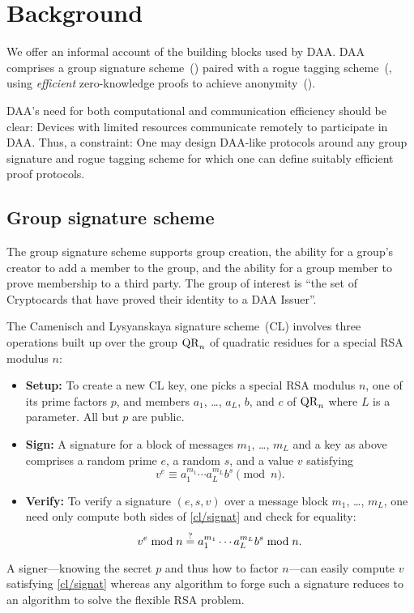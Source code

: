 \section{Background}

\begin{comment}
	\emph{PDS:}
	DAA as a combination of building blocks.
	Why DAA is cool.
	Hilight all the stuff you need to understand in order to understand DAA with words and no math formulae.
\end{comment}

We offer an informal account of the building blocks used by DAA.
DAA comprises a group signature scheme~() paired with a rogue tagging scheme~(, using \emph{efficient} zero-knowledge proofs to achieve anonymity~().

DAA's need for both computational and communication efficiency should be clear:
Devices with limited resources communicate remotely to participate in DAA.
Thus, a constraint: One may design DAA-like protocols around any group
signature and rogue tagging scheme for which one can define suitably efficient
proof protocols.

\subsection{Group signature scheme}

The group signature scheme supports group creation,
the ability for a group's creator to add a member to the group,
and the ability for a group member to prove membership to a third party.
The group of interest is ``the set of Cryptocards that have proved
their identity to a DAA Issuer''.

The Camenisch and Lysyanskaya signature scheme~(CL)
involves three operations built up over the group $\mathrm{QR}_n$
of quadratic residues for a special RSA modulus $n$:
\begin{itemize}

\item \textbf{Setup:} To create a new CL key,
one picks a special RSA modulus $n$, one of its prime
factors $p$,
and members $a_1$, \ldots, $a_L$, $b$, and $c$ of $\mathrm{QR}_n$
where $L$ is a parameter.
All but $p$ are public.

\item \textbf{Sign:}
A signature for a block of messages $m_1$, \ldots, $m_L$
and a key as above comprises a random prime $e$, a random $s$, and a
value $v$ satisfying
\begin{equation}\label{cl/signat}
	v^e \equiv a_1^{m_1} \cdots a_L^{m_L} b^s \pmod n.
\end{equation}

\item \textbf{Verify:}
To verify a signature $(e, s, v)$ over a message block $m_1$, \ldots, $m_L$,
one need only compute both sides of \eqref{cl/signat} and check for equality:
$$	
	v^e \bmod n \mathrel{\overset{\mathrm{?}}{=}} a_1^{m_1} \cdots a_L^{m_L} b^s \bmod n.
$$
\end{itemize}
A signer---knowing the secret $p$ and thus how to factor $n$---can
easily compute $v$ satisfying \eqref{cl/signat}
whereas any algorithm to forge such a signature
reduces to an algorithm to solve the flexible RSA problem.

